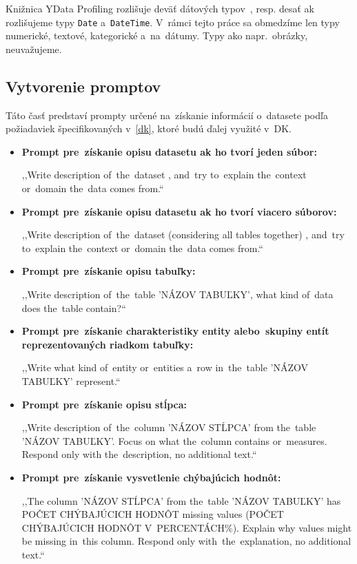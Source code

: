 Knižnica YData Profiling rozlišuje deväť dátových typov~\cite{ydata-profiling-datatypes}, resp. desať ak rozlišujeme typy \texttt{Date} a~\texttt{DateTime}. V~rámci tejto práce sa obmedzíme len typy numerické, textové, kategorické a~na~dátumy. Typy ako napr.~obrázky, neuvažujeme.

\subsection{Vytvorenie promptov}
\label{vytvorenie-promptov}

Táto časť predstaví prompty určené na~získanie informácií o~datasete podľa požiadaviek špecifikovaných v~\ref{dk}, ktoré budú ďalej využité v~DK.

\begin{itemize}
\item \textbf{Prompt pre~získanie opisu datasetu ak ho tvorí jeden súbor:}

,,Write description of~the~dataset , and~try to~explain the~context or~domain the~data comes from.``

\item \textbf{Prompt pre~získanie opisu datasetu ak ho tvorí viacero súborov:}

,,Write description of~the~dataset (considering all tables together) , and~try to~explain the~context or~domain the~data comes from.``

\item \textbf{Prompt pre~získanie opisu tabuľky:}

,,Write description of~the~table '{NÁZOV TABUĽKY}', what kind of~data does the~table contain?``

\item \textbf{Prompt pre~získanie charakteristiky entity alebo~skupiny entít reprezentovaných riadkom tabuľky:}

,,Write what kind of~entity or~entities a~row in~the~table '{NÁZOV TABUĽKY}' represent.``

\item \textbf{Prompt pre~získanie opisu stĺpca:}

,,Write description of~the~column '{NÁZOV STĹPCA}' from the~table '{NÁZOV TABUĽKY}'. Focus on what the~column contains or~measures. Respond only with the~description, no additional text.``

\item \textbf{Prompt pre~získanie vysvetlenie chýbajúcich hodnôt:}

,,The column '{NÁZOV STĹPCA}' from the~table '{NÁZOV TABUĽKY}' has {POČET CHÝBAJÚCICH HODNÔT} missing values ({POČET CHÝ\-BA\-JÚ\-CICH HODNÔT V~PERCENTÁCH}\%). Explain why values might be missing in~this column. Respond only with~the~explanation, no additional text.``


\end{itemize}
